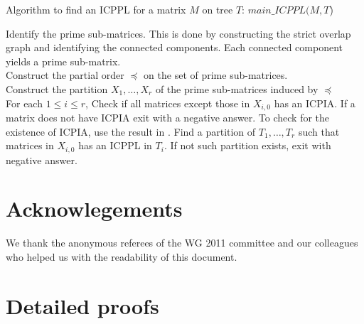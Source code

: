 \documentclass{fsttcs}
\begin{document}
\begin{algorithm}[h]
\caption{Algorithm to find an ICPPL for a matrix $M$ on tree $T$: $main\_ICPPL(M, T$)}
\label{Al:icppa-main}
\begin{algorithmic}
\STATE Identify the prime sub-matrices. This is done by constructing
the strict overlap graph and identifying the connected components. Each
connected component yields a prime sub-matrix.   \\ 
\STATE Construct the partial order $\preccurlyeq$ on the set of prime
sub-matrices.  \\ 
\STATE Construct the partition $X_1,\ldots,X_r$ of the  prime
sub-matrices induced by $\preccurlyeq$ \\
\STATE For each $1 \leq i \leq r$, Check if all matrices except those
in $X_{i,0}$ has an ICPIA.  If a matrix does not have ICPIA exit with
a negative answer.  To check for the existence of ICPIA, use the
result in \cite{nsnrs09}. 
\label{l:icppasubtree} \STATE  Find a partition of $T_1, \ldots, T_r$ such that matrices in
$X_{i,0}$ has an ICPPL in $T_i$.  If not such 
partition exists, exit with negative answer.  
\end{algorithmic}
\end{algorithm}




\section {Acknowlegements} 
We thank the anonymous referees of the WG 2011 committee and our
colleagues who helped us with the readability of this document.


%



\pagebreak
\appendix

\section{Detailed proofs}
\end{document}

